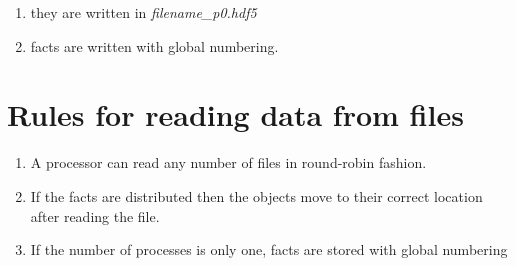 \begin{enumerate}
\item they are written in {\em filename\_p0.hdf5}
\item facts are written with global numbering.
\end{enumerate}
\section {Rules for reading data from files}

\begin{enumerate}
\item A processor can read any number of files in round-robin fashion. 
\item If the facts are distributed then the objects move to their
correct location after reading the file. 
\item If the number of processes is only one, facts are stored with
global numbering
\end{enumerate}

